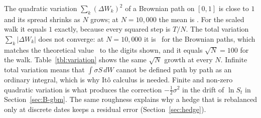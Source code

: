 The quadratic variation $\sum_k(\Delta W_k)^2$ of a Brownian path on $[0,1]$ is close to $1$ and its spread shrinks as $N$ grows; at $N=10{,}000$ the mean is \QVBMtenk.
For the scaled walk it equals $1$ exactly, because every squared step is $T/N$.
The total variation $\sum_k|\Delta W_k|$ does not converge: at $N=10{,}000$ it is \TVBMtenk\ for the Brownian paths, which matches the theoretical value \TVtheorytenk\ to the digits shown, and it equals $\sqrt N=100$ for the walk.
Table~\ref{tbl:variation} shows the same $\sqrt N$ growth at every $N$.
Infinite total variation means that $\int\sigma S\,dW$ cannot be defined path by path as an ordinary integral, which is why It\^o calculus is needed.
Finite and non-zero quadratic variation is what produces the correction $-\tfrac12\sigma^2$ in the drift of $\ln S_t$ in Section~\ref{sec:B-gbm}.
The same roughness explains why a hedge that is rebalanced only at discrete dates keeps a residual error (Section~\ref{sec:hedge}).
